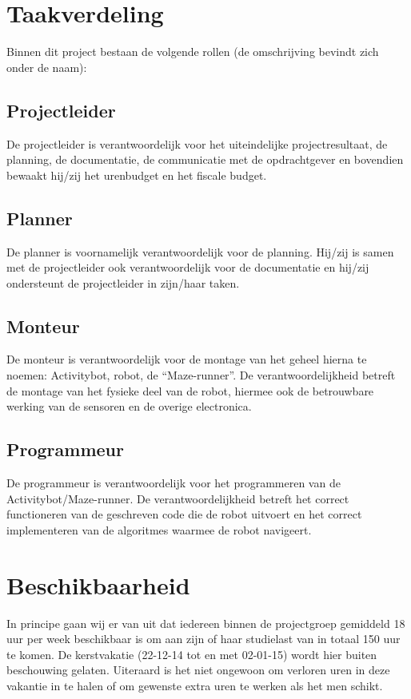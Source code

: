 \documentclass[oneside]{book}
\begin{document}
\section*{Taakverdeling}
Binnen dit project bestaan de volgende rollen (de omschrijving bevindt zich onder de naam):
\subsection*{Projectleider}
De projectleider is verantwoordelijk voor het uiteindelijke projectresultaat, de planning, de
documentatie, de communicatie met de opdrachtgever en bovendien bewaakt hij/zij het urenbudget
en het fiscale budget.
\subsection*{Planner}
De planner is voornamelijk verantwoordelijk voor de planning.
Hij/zij is samen met de projectleider ook verantwoordelijk voor de documentatie en {\color{red}hij/zij ondersteunt de projectleider in zijn/haar taken.}
\subsection*{Monteur}
De monteur is verantwoordelijk voor de montage van het geheel hierna te noemen: Activitybot,
robot, de “Maze-runner”.
De verantwoordelijkheid betreft de montage van het fysieke deel van de robot, hiermee ook de
betrouwbare werking van de sensoren en de overige electronica.
\subsection*{Programmeur}
De programmeur is verantwoordelijk voor het programmeren van de Activitybot/Maze-runner.
De verantwoordelijkheid betreft het correct functioneren van de geschreven code die de
robot uitvoert en het correct implementeren van de algoritmes waarmee de robot navigeert.

\section*{Beschikbaarheid}
In principe gaan wij er van uit dat iedereen binnen de projectgroep gemiddeld 18 uur per week
beschikbaar is om aan zijn of haar studielast van in totaal 150 uur te komen.
De kerstvakatie (22-12-14 tot en met 02-01-15) wordt hier buiten beschouwing gelaten. Uiteraard is het
niet ongewoon om verloren uren in deze vakantie in te halen of om gewenste extra uren te werken als het men schikt.
\end{document}
